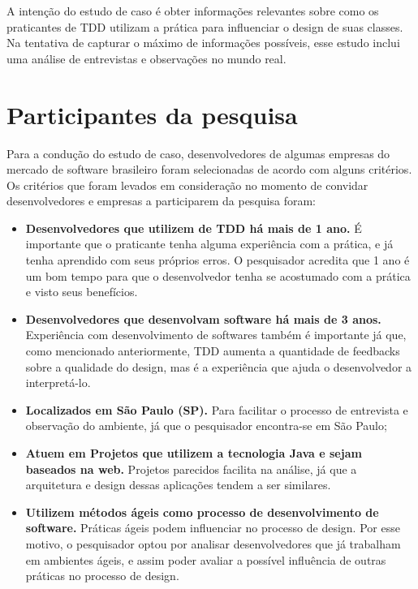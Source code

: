 A intenção do estudo de caso é obter informações relevantes sobre como os
praticantes de TDD utilizam a prática para influenciar o design de suas
classes. Na tentativa de capturar o máximo de informações possíveis, esse estudo
inclui uma análise de entrevistas e observações no mundo real.

\section{Participantes da pesquisa}
\label{sec:planejamento-participantes}

Para a condução do estudo de caso, desenvolvedores de algumas empresas do mercado de 
software brasileiro foram selecionadas de acordo com alguns critérios.
Os critérios que foram levados em consideração no momento de convidar desenvolvedores
e empresas a participarem da pesquisa foram:

\begin{itemize}
	\item \textbf{Desenvolvedores que utilizem de TDD há mais de 1 ano.} É importante
	que o praticante tenha alguma experiência com a prática, e já tenha aprendido com
	seus próprios erros. O pesquisador acredita que 1 ano é um bom tempo para que o
	desenvolvedor tenha se acostumado com a prática e visto seus benefícios.  
	
	\item \textbf{Desenvolvedores que desenvolvam software há mais de 3 anos.} Experiência
	com desenvolvimento de softwares também é importante já que, como mencionado anteriormente,
	TDD aumenta a quantidade de feedbacks sobre a qualidade do design, mas é a experiência 
	que ajuda o desenvolvedor a interpretá-lo.

	\item \textbf{Localizados em São Paulo (SP).} Para facilitar o processo de
	entrevista e observação do ambiente, já que o pesquisador encontra-se em São Paulo;

	\item \textbf{Atuem em Projetos que utilizem a tecnologia Java e sejam baseados na web.} 
	Projetos parecidos facilita na análise, já que a arquitetura e design dessas aplicações
	tendem a ser similares.

	\item \textbf{Utilizem métodos ágeis como processo de desenvolvimento de software.} 
	Práticas ágeis podem influenciar no processo de design. Por esse motivo, o pesquisador
	optou por analisar desenvolvedores que já trabalham em ambientes ágeis, e assim poder
	avaliar a possível influência de outras práticas no processo de design.
	
\end{itemize}

